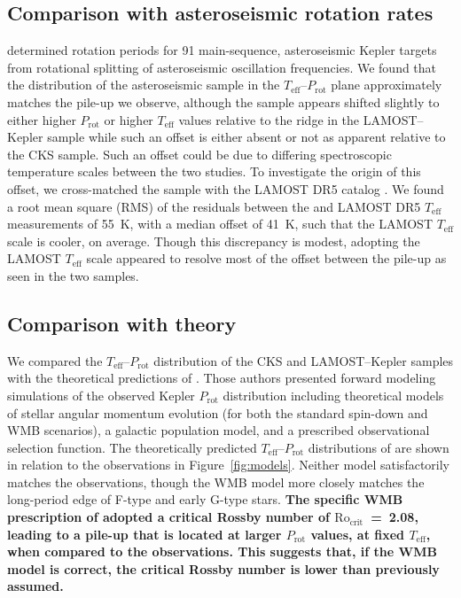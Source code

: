 \documentclass[twocolumn]{aastex631}
\newcommand{\rocrit}{$\mathrm{Ro_{crit}}$\xspace}
\newcommand{\teff}{\ensuremath{T_{\mathrm{eff}}}\xspace}
\newcommand{\prot}{\ensuremath{P_\mathrm{rot}}\xspace}
\begin{document}
\subsection{Comparison with asteroseismic rotation rates}
\label{subsec:asteroseismic}

\citet{Hall2021} determined rotation periods for 91 main-sequence, asteroseismic Kepler targets from rotational splitting of asteroseismic oscillation frequencies. We found that the distribution of the asteroseismic sample in the \teff--\prot plane approximately matches the pile-up we observe, although the \citet{Hall2021} sample appears shifted slightly to either higher \prot or higher \teff values relative to the ridge in the LAMOST--Kepler sample while such an offset is either absent or not as apparent relative to the CKS sample. Such an offset could be due to differing spectroscopic temperature scales between the two studies. To investigate the origin of this offset, we cross-matched the \citet{Hall2021} sample with the LAMOST DR5 catalog \citep{Xiang2019}. We found a root mean square (RMS) of the residuals between the \citet{Hall2021} and LAMOST DR5 \teff measurements of 55~K, with a median offset of 41~K, such that the LAMOST \teff scale is cooler, on average. Though this discrepancy is modest, adopting the LAMOST \teff scale appeared to resolve most of the offset between the pile-up as seen in the two samples. 

\iffalse
\begin{figure}
    \centering
    \texttt{[image: asteroseismic.pdf]}
    \caption{Comparison of CKS (left) and LAMOST--Kepler samples (right) with the \citet{Hall2021} main-sequence asteroseismic sample in the \teff--\prot plane.}
    \label{fig:asteroseismic}
\end{figure}
\fi 


\subsection{Comparison with theory}
\label{subsec:models}

We compared the \teff--\prot distribution of the CKS and LAMOST--Kepler samples with the theoretical predictions of \citet{vanSaders2019}. Those authors presented forward modeling simulations of the observed Kepler \prot distribution including theoretical models of stellar angular momentum evolution (for both the standard spin-down and WMB scenarios), a galactic population model, and a prescribed observational selection function. The theoretically predicted \teff--\prot distributions of \citet{vanSaders2019} are shown in relation to the observations in Figure~\ref{fig:models}. Neither model satisfactorily matches the observations, though the WMB model more closely matches the long-period edge of F-type and early G-type stars. \textbf{The specific WMB prescription of \citet{vanSaders2019} adopted a critical Rossby number of \rocrit~=~2.08, leading to a pile-up that is located at larger \prot values, at fixed \teff, when compared to the observations. This suggests that, if the WMB model is correct, the critical Rossby number is lower than previously assumed.} 
\end{document}
